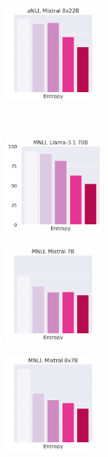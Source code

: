 \begin{figure}[t]
\begin{subfigure}[b]{0.23\textwidth}
    \end{subfigure}
    \begin{subfigure}[b]{0.23\textwidth}
        \includegraphics[height=3.6cm]{figures/appendix/entropy_acc_abductivenli_8x22B}
    \end{subfigure}\\
    \begin{subfigure}[b]{0.23\textwidth}
        \includegraphics[height=3.6cm]{figures/appendix/entropy_acc_mnli_matched_70B}
    \end{subfigure}
    \begin{subfigure}[b]{0.23\textwidth}
        \includegraphics[height=3.6cm]{figures/appendix/entropy_acc_mnli_matched_7B}
    \end{subfigure}
    \begin{subfigure}[b]{0.23\textwidth}
        \includegraphics[height=3.6cm]{figures/appendix/entropy_acc_mnli_matched_8x7B}

\end{subfigure}
\end{figure}
